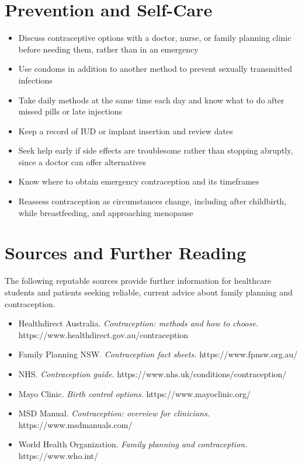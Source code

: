 \section*{Prevention and Self-Care}
\begin{itemize}
    \item Discuss contraceptive options with a doctor, nurse, or family planning clinic before needing them, rather than in an emergency
    \item Use condoms in addition to another method to prevent sexually transmitted infections
    \item Take daily methods at the same time each day and know what to do after missed pills or late injections
    \item Keep a record of IUD or implant insertion and review dates
    \item Seek help early if side effects are troublesome rather than stopping abruptly, since a doctor can offer alternatives
    \item Know where to obtain emergency contraception and its timeframes
    \item Reassess contraception as circumstances change, including after childbirth, while breastfeeding, and approaching menopause
\end{itemize}

\section*{Sources and Further Reading}
The following reputable sources provide further information for healthcare students and patients seeking reliable, current advice about family planning and contraception.
\begin{itemize}
    \item Healthdirect Australia. \textit{Contraception: methods and how to choose.} https://www.healthdirect.gov.au/contraception
    \item Family Planning NSW. \textit{Contraception fact sheets.} https://www.fpnsw.org.au/
    \item NHS. \textit{Contraception guide.} https://www.nhs.uk/conditions/contraception/
    \item Mayo Clinic. \textit{Birth control options.} https://www.mayoclinic.org/
    \item MSD Manual. \textit{Contraception: overview for clinicians.} https://www.msdmanuals.com/
    \item World Health Organization. \textit{Family planning and contraception.} https://www.who.int/
\end{itemize}
